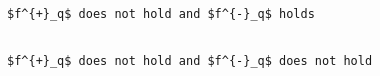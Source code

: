 \lstset{mathescape, language=AST} 
\begin{lstlisting}[frame=single, caption={Answerable Queries: Permission Denied},label={lst:permissiondenieddecision}]

$f^{+}_q$ does not hold and $f^{-}_q$ holds

\end{lstlisting}

\lstset{mathescape, language=AST} 
\begin{lstlisting}[frame=single, caption={Answerable Queries: Permission Unregulated},label={lst:permissionunregulateddecision}]

$f^{+}_q$ does not hold and $f^{-}_q$ does not hold

\end{lstlisting}

























